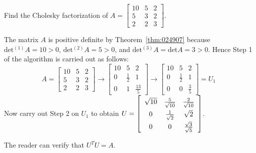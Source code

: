 \documentclass{ximera}
\begin{document}
\begin{example}\label{exa:024959}
Find the Cholesky factorization of $A = \left[ \begin{array}{rrr}
10 & 5 & 2 \\
5 & 3 & 2 \\
2 & 2 & 3
\end{array}\right]$.


\begin{solution}
  The matrix $A$ is positive definite by Theorem~\ref{thm:024907} because $\mbox{det}{^{(1)}A} = 10 > 0$, $\mbox{det}{^{(2)}A} = 5 > 0$, and $\mbox{det}{^{(3)}A} = \mbox{det} A = 3 > 0$. Hence Step 1 of the algorithm is carried out as follows:
\begin{equation*}
A = \left[ \begin{array}{rrr}
10 & 5 & 2 \\
5 & 3 & 2 \\
2 & 2 & 3
\end{array}\right] \rightarrow \left[ \begin{array}{rrc}
10 & 5 & 2 \\
0 & \frac{1}{2} & 1 \\
0 & 1 & \frac{13}{5}
\end{array}\right] \rightarrow \left[ \begin{array}{rrr}
10 & 5 & 2 \\
0 & \frac{1}{2} & 1 \\
0 & 0 & \frac{3}{5}
\end{array}\right] = U_{1}
\end{equation*}
Now carry out Step 2 on $U_{1}$ to obtain $U = \left[ \def\arraystretch{1.5}\begin{array}{ccc}
\sqrt{10} & \frac{5}{\sqrt{10}} & \frac{2}{\sqrt{10}} \\
0 & \frac{1}{\sqrt{2}} & \sqrt{2} \\
0 & 0 & \frac{\sqrt{3}}{\sqrt{5}}
\end{array}\right]$.

The reader can verify that $U^{T}U = A$.
\end{solution}
\end{example}
\end{document}
